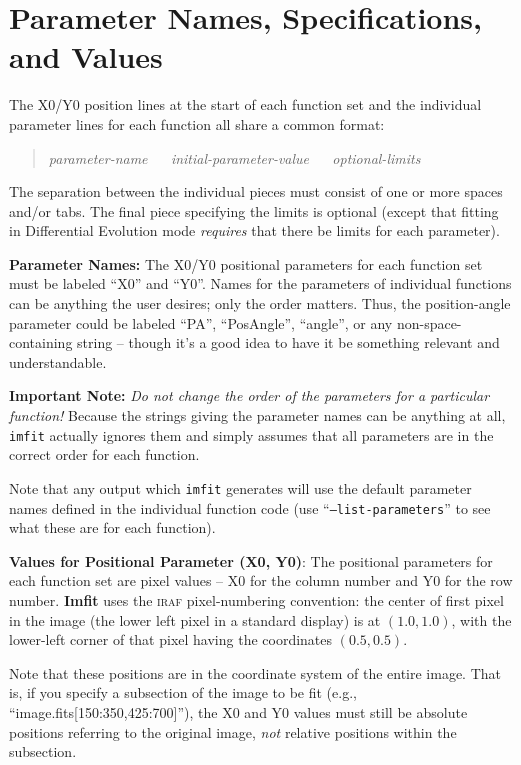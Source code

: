 \documentclass[10pt,a4paper,article]{memoir}
\newcommand{\Imfit}{\textbf{Imfit}}
\newcommand{\imfitprog}{\texttt{imfit}}
\begin{document}
\section{Parameter Names, Specifications, and Values}

The X0/Y0 position lines at the start of each function set and the
individual parameter lines for each function all share a common format:
\begin{quote}
\textit{parameter-name} ~~ \textit{initial-parameter-value} ~~ \textit{optional-limits}
\end{quote}
The separation between the individual pieces must consist of one or more spaces
and/or tabs. The final piece specifying the limits is optional (except that
fitting in Differential Evolution mode \textit{requires} that there be limits
for each parameter).

\bigskip

\textbf{Parameter Names:} The X0/Y0 positional parameters for each
function set must be labeled ``X0'' and ``Y0''. Names for the
parameters of individual functions can be anything the user desires;
only the order matters. Thus, the position-angle parameter could be
labeled ``PA'', ``PosAngle'', ``angle'', or any non-space-containing
string -- though it's a good idea to have it be something relevant
and understandable.

\textbf{Important Note:} \textit{Do not change the order of the parameters
for a particular function!}  Because the strings giving the parameter names
can be anything at all, \imfitprog{} actually ignores them and simply assumes
that all parameters are in the correct order for each function.

Note that any output which \imfitprog{} generates will use the default parameter
names defined in the individual function code (use ``\texttt{--list-parameters}''
to see what these are for each function).

\bigskip

\textbf{Values for Positional Parameter (X0, Y0)}: The positional parameters
for each function set are pixel values -- X0 for the column number and
Y0 for the row number. \Imfit{} uses the \textsc{iraf} pixel-numbering
convention: the center of first pixel in the image (the lower left pixel
in a standard display) is at $(1.0,1.0)$, with the lower-left corner of that
pixel having the coordinates $(0.5,0.5)$.

Note that these positions are in the coordinate system of the entire
image. That is, if you specify a subsection of the image to be fit
(e.g., ``image.fits[150:350,425:700]''), the X0 and Y0 values must still
be absolute positions referring to the original image, \textit{not} relative
positions within the subsection.
\end{document}
